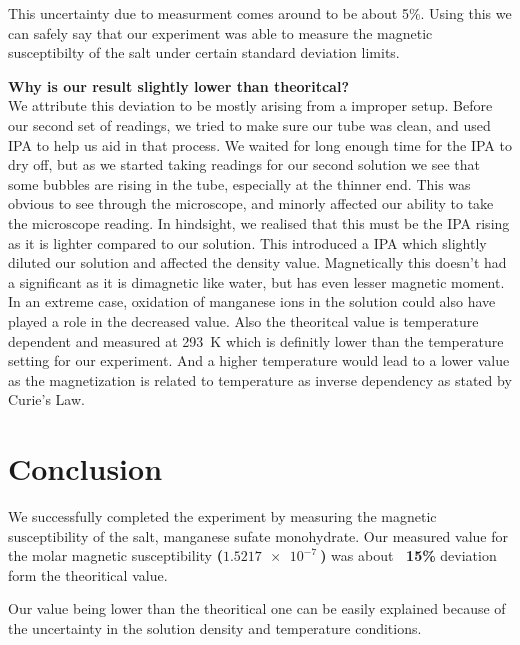 \documentclass[../main.tex]{subfiles}
\begin{document}
This uncertainty due to measurment comes around to be about 5\%. Using this we can safely say that our experiment was able to measure the magnetic susceptibilty of the salt under certain standard deviation limits.

\textbf{Why is our result slightly lower than theoritcal?} \\
We attribute this deviation to be mostly arising from a improper setup. Before our second set of readings, we tried to make sure our tube was clean, and used IPA to help us aid in that process. We waited for long enough time for the IPA to dry off, but as we started taking readings for our second solution we see that some bubbles are rising in the tube, especially at the thinner end. This was obvious to see through the microscope, and minorly affected our ability to take the microscope reading. In hindsight, we realised that this must be the IPA rising as it is lighter compared to our solution. This introduced a IPA which slightly diluted our solution and affected the density value. Magnetically this doesn't had a significant as it is dimagnetic like water, but has even lesser magnetic moment. In an extreme case, oxidation of manganese ions in the solution could also have played a role in the decreased value. Also the theoritcal value is temperature dependent and measured at \SI{293}{\kelvin} which is definitly lower than the temperature setting for our experiment. And a higher temperature would lead to a lower value as the magnetization is related to temperature as inverse dependency as stated by Curie's Law.


\section{Conclusion}
We successfully completed the experiment by measuring the magnetic susceptibility of the salt, manganese sufate monohydrate. Our measured value for the molar magnetic susceptibility \textbf{($\SI{1.5217e-7}{}$)} was about \textbf{~15\%} deviation form the theoritical value.

Our value being lower than the theoritical one can be easily explained because of the uncertainty in the solution density and temperature conditions.
\end{document}
